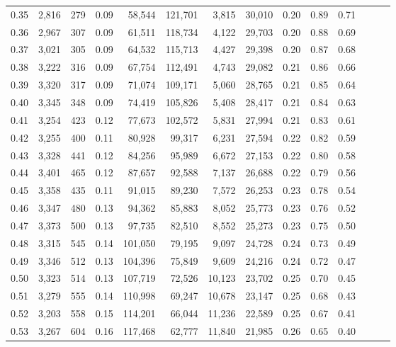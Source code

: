 \begin{tabular}{rrrrrrrrrrrrrr}
0.35 &  2,816 &    279 &  0.09 &   58,544 &  121,701 &   3,815 &  30,010 &  0.20 &  0.89 &      0.71 \\
0.36 &  2,967 &    307 &  0.09 &   61,511 &  118,734 &   4,122 &  29,703 &  0.20 &  0.88 &      0.69 \\
0.37 &  3,021 &    305 &  0.09 &   64,532 &  115,713 &   4,427 &  29,398 &  0.20 &  0.87 &      0.68 \\
0.38 &  3,222 &    316 &  0.09 &   67,754 &  112,491 &   4,743 &  29,082 &  0.21 &  0.86 &      0.66 \\
0.39 &  3,320 &    317 &  0.09 &   71,074 &  109,171 &   5,060 &  28,765 &  0.21 &  0.85 &      0.64 \\
0.40 &  3,345 &    348 &  0.09 &   74,419 &  105,826 &   5,408 &  28,417 &  0.21 &  0.84 &      0.63 \\
0.41 &  3,254 &    423 &  0.12 &   77,673 &  102,572 &   5,831 &  27,994 &  0.21 &  0.83 &      0.61 \\
0.42 &  3,255 &    400 &  0.11 &   80,928 &   99,317 &   6,231 &  27,594 &  0.22 &  0.82 &      0.59 \\
0.43 &  3,328 &    441 &  0.12 &   84,256 &   95,989 &   6,672 &  27,153 &  0.22 &  0.80 &      0.58 \\
0.44 &  3,401 &    465 &  0.12 &   87,657 &   92,588 &   7,137 &  26,688 &  0.22 &  0.79 &      0.56 \\
0.45 &  3,358 &    435 &  0.11 &   91,015 &   89,230 &   7,572 &  26,253 &  0.23 &  0.78 &      0.54 \\
0.46 &  3,347 &    480 &  0.13 &   94,362 &   85,883 &   8,052 &  25,773 &  0.23 &  0.76 &      0.52 \\
0.47 &  3,373 &    500 &  0.13 &   97,735 &   82,510 &   8,552 &  25,273 &  0.23 &  0.75 &      0.50 \\
0.48 &  3,315 &    545 &  0.14 &  101,050 &   79,195 &   9,097 &  24,728 &  0.24 &  0.73 &      0.49 \\
0.49 &  3,346 &    512 &  0.13 &  104,396 &   75,849 &   9,609 &  24,216 &  0.24 &  0.72 &      0.47 \\
0.50 &  3,323 &    514 &  0.13 &  107,719 &   72,526 &  10,123 &  23,702 &  0.25 &  0.70 &      0.45 \\
0.51 &  3,279 &    555 &  0.14 &  110,998 &   69,247 &  10,678 &  23,147 &  0.25 &  0.68 &      0.43 \\
0.52 &  3,203 &    558 &  0.15 &  114,201 &   66,044 &  11,236 &  22,589 &  0.25 &  0.67 &      0.41 \\
0.53 &  3,267 &    604 &  0.16 &  117,468 &   62,777 &  11,840 &  21,985 &  0.26 &  0.65 &      0.40 \\

\end{tabular}
